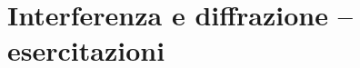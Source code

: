 \chapter[Interferenza e diffrazione -- es.]{Interferenza e diffrazione -- esercitazioni}











